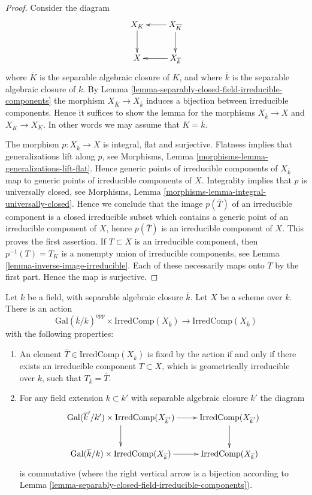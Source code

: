 \begin{proof}
Consider the diagram
$$
\xymatrix{
X_K \ar[d] & X_{\overline{K}} \ar[d] \ar[l] \\
X & X_{\overline{k}} \ar[l]
}
$$
where $\overline{K}$ is the separable algebraic closure of $K$, and
where $\overline{k}$ is the separable algebraic closure of $k$. By
Lemma \ref{lemma-separably-closed-field-irreducible-components}
the morphism $X_{\overline{K}} \to X_{\overline{k}}$ induces
a bijection between irreducible components. Hence it suffices
to show the lemma for the morphisms
$X_{\overline{k}} \to X$ and $X_{\overline{K}} \to X_K$.
In other words we may assume that $K = \overline{k}$.

\medskip\noindent
The morphism $p : X_{\overline{k}} \to X$ is integral, flat and surjective.
Flatness implies that generalizations lift along $p$, see
Morphisms, Lemma \ref{morphisms-lemma-generalizations-lift-flat}.
Hence generic points of irreducible components of $X_{\overline{k}}$
map to generic points of irreducible components of $X$.
Integrality implies that $p$ is universally closed, see
Morphisms, Lemma \ref{morphisms-lemma-integral-universally-closed}.
Hence we conclude that the image $p(\overline{T})$ of an irreducible component
is a closed irreducible subset which contains a generic point of an
irreducible component of $X$, hence $p(\overline{T})$
is an irreducible component of $X$. This proves the first assertion.
If $T \subset X$ is an irreducible component, then $p^{-1}(T) =T_K$
is a nonempty union of irreducible components, see
Lemma \ref{lemma-inverse-image-irreducible}.
Each of these necessarily maps onto $T$ by the first part.
Hence the map is surjective.
\end{proof}

\begin{lemma}
\label{lemma-galois-action-irreducible-components}
Let $k$ be a field, with separable algebraic closure $\overline{k}$.
Let $X$ be a scheme over $k$.
There is an action
$$
\text{Gal}(\overline{k}/k)^{opp} \times \text{IrredComp}(X_{\overline{k}})
\longrightarrow
\text{IrredComp}(X_{\overline{k}})
$$
with the following properties:
\begin{enumerate}
\item An element $\overline{T} \in \text{IrredComp}(X_{\overline{k}})$
is fixed by the action if and only if there exists an irreducible
component $T \subset X$, which is geometrically irreducible over $k$,
such that $T_{\overline{k}} = \overline{T}$.
\item For any field extension $k \subset k'$ with separable
algebraic closure $\overline{k}'$ the diagram
$$
\xymatrix{
\text{Gal}(\overline{k}'/k') \times \text{IrredComp}(X_{\overline{k}'})
\ar[r] \ar[d] &
\text{IrredComp}(X_{\overline{k}'}) \ar[d] \\
\text{Gal}(\overline{k}/k) \times \text{IrredComp}(X_{\overline{k}})
\ar[r] &
\text{IrredComp}(X_{\overline{k}})
}
$$
is commutative (where the right vertical arrow is a bijection
according to Lemma \ref{lemma-separably-closed-field-irreducible-components}).
\end{enumerate}
\end{lemma}

